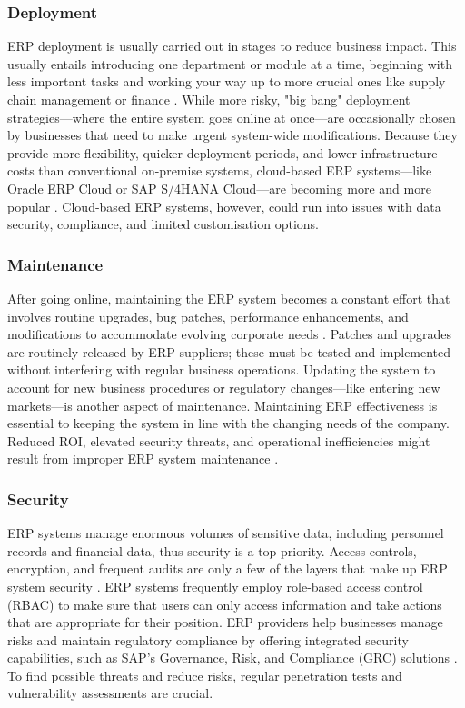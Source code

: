 \subsubsection{Deployment}
\par{ERP deployment is usually carried out in stages to reduce business impact. This usually entails introducing one department or module at a time, beginning with less important tasks and working your way up to more crucial ones like supply chain management or finance \citep{monk2013concepts}. While more risky, "big bang" deployment strategies—where the entire system goes online at once—are occasionally chosen by businesses that need to make urgent system-wide modifications. Because they provide more flexibility, quicker deployment periods, and lower infrastructure costs than conventional on-premise systems, cloud-based ERP systems—like Oracle ERP Cloud or SAP S/4HANA Cloud—are becoming more and more popular \citep{vukovic2023erp}. Cloud-based ERP systems, however, could run into issues with data security, compliance, and limited customisation options.}
\subsubsection{Maintenance}
\par{After going online, maintaining the ERP system becomes a constant effort that involves routine upgrades, bug patches, performance enhancements, and modifications to accommodate evolving corporate needs \citep{ahmad2013critical}. Patches and upgrades are routinely released by ERP suppliers; these must be tested and implemented without interfering with regular business operations. Updating the system to account for new business procedures or regulatory changes—like entering new markets—is another aspect of maintenance. Maintaining ERP effectiveness is essential to keeping the system in line with the changing needs of the company. Reduced ROI, elevated security threats, and operational inefficiencies might result from improper ERP system maintenance \citep{hawking2004revisiting}.}
\subsubsection{Security}
\par{ERP systems manage enormous volumes of sensitive data, including personnel records and financial data, thus security is a top priority. Access controls, encryption, and frequent audits are only a few of the layers that make up ERP system security \citep{tarafdar2003analyzing}. ERP systems frequently employ role-based access control (RBAC) to make sure that users can only access information and take actions that are appropriate for their position. ERP providers help businesses manage risks and maintain regulatory compliance by offering integrated security capabilities, such as SAP's Governance, Risk, and Compliance (GRC) solutions \citep{hawari2010explaining}. To find possible threats and reduce risks, regular penetration tests and vulnerability assessments are crucial.}

